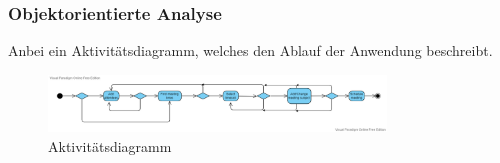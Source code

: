 \subsubsection{Objektorientierte Analyse}\label{subsubsec:objektorientierte-analyse}
Anbei ein Aktivitätsdiagramm, welches den Ablauf der Anwendung beschreibt.
\par\vspace{1cm}
\begin{figure}[h]
\centering
\includegraphics[width=0.8\textwidth]{Bilder/Objektorientierte Analyse/Ressource booking activity diagramm}
\caption{Aktivitätsdiagramm}
\label{fig:Aktivitätsdiagramm}
\end{figure}
\par\vspace{1cm}
\justifying
\newline
